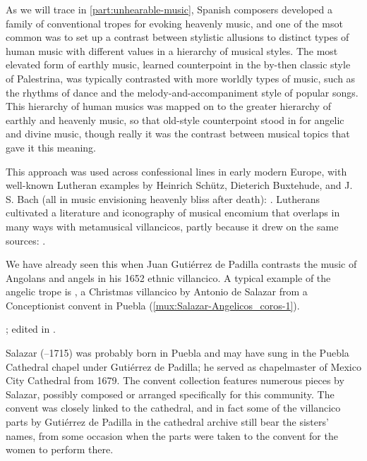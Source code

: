 As we will trace in \cref{part:unhearable-music}, Spanish composers developed a
family of conventional tropes for evoking heavenly music, and one of the msot
common was to set up a contrast between stylistic allusions to distinct types
of human music with different values in a hierarchy of musical styles.
The most elevated form of earthly music, learned counterpoint in the by-then
classic style of Palestrina, was typically contrasted with more worldly types
of music, such as the rhythms of dance and the melody-and-accompaniment style
of popular songs.
This hierarchy of human musics was mapped on to the greater hierarchy of
earthly and heavenly music, so that old-style counterpoint stood in for
angelic and divine music, though really it was the contrast between musical
topics that gave it this meaning.%
\begin{Footnote}
    This approach was used across confessional lines in early modern Europe,
    with well-known Lutheran examples by Heinrich Schütz, Dieterich Buxtehude,
    and J. S. Bach (all in music envisioning heavenly bliss after death):
    \autocites
    {Johnston:Rhetorical}
    {Yearsley:Buxtehude}
    {Yearsley:BachCounterpoint}.
    Lutherans cultivated a literature and iconography of musical encomium that
    overlaps in many ways with metamusical villancicos, partly because it drew
    on the same sources:
    \autocite{Schmidt:Lob_der_Musik}.
\end{Footnote}
We have already seen this when Juan Gutiérrez de Padilla contrasts the music of
Angolans and angels in his 1652 ethnic villancico.
A typical example of the angelic trope is , a Christmas villancico by Antonio de Salazar from a Conceptionist
convent in Puebla (\cref{mux:Salazar-Angelicos_coros-1}).%
\begin{Footnote} 
    ; edited in \autocite{Cashner:WLSCM32}.  
\end{Footnote}
Salazar (--1715) was probably born in Puebla and may have sung in
the Puebla Cathedral chapel under Gutiérrez de Padilla; he served as
chapelmaster of Mexico City Cathedral from 1679.%
    \Autocite{Koegel:Salazar} 
The convent collection features numerous pieces by Salazar, possibly composed
or arranged specifically for this community.
The convent was closely linked to the cathedral, and in fact some of the
villancico parts by Gutiérrez de Padilla in the cathedral archive still bear
the sisters' names, from some occasion when the parts were taken to the convent
for the women to perform there.%
    \Autocites
    {Favila:Profession}
    {Tello:SanchezGarzaCatalogo}

